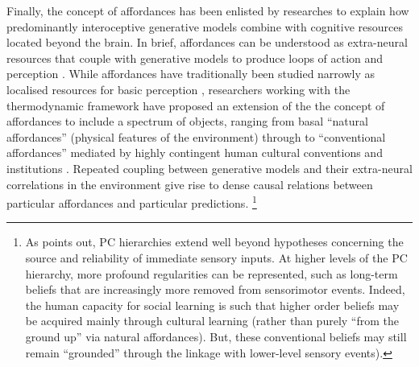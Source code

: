 \begin{CJK}{UTF8}{gbsn}
Finally, the concept of affordances \citep{Gibson1979} has been enlisted by researches to explain how predominantly interoceptive generative models combine with cognitive resources located beyond the brain.  In brief, affordances can be understood as extra-neural resources that couple with generative models to produce loops of action and perception \citep{Ramstead2016,Clark2015}.  While affordances have traditionally been studied narrowly as localised resources for basic perception \citep[e.g.][]{Fajen2011}, researchers working with the thermodynamic framework have proposed an extension of the the concept of affordances to include a spectrum of objects, ranging from basal ``natural affordances'' (physical features of the environment) through to ``conventional affordances'' mediated by highly contingent human cultural conventions and institutions  \citep[see][]{Roepstorff2010,Ramstead2016}.  Repeated coupling between generative models and their extra-neural correlations in the environment give rise to dense causal relations between particular affordances and particular predictions.
      \footnote{
      As \textcite[906]{Pezzulo2014} points out, PC hierarchies extend well beyond hypotheses concerning the source and reliability of immediate sensory inputs. At higher levels of the PC hierarchy, more profound regularities can be represented, such as long-term beliefs that are increasingly more removed from sensorimotor events. Indeed, the human capacity for social learning is such that higher order beliefs may be acquired mainly through cultural learning (rather than purely ``from the ground up'' via natural affordances). But, these conventional beliefs may still remain ``grounded'' through the linkage with lower-level sensory events).
      }



\end{CJK}

